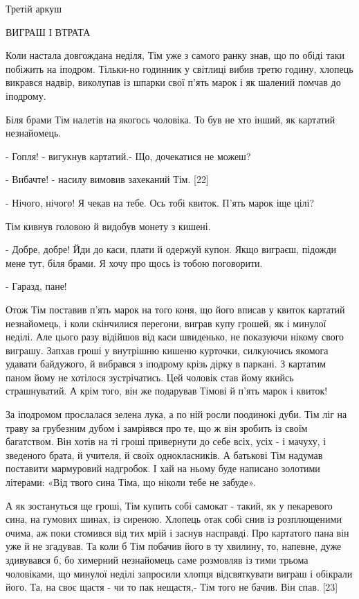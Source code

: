 Третій аркуш

ВИГРАШ І ВТРАТА

Коли настала довгождана неділя, Тім уже з самого ранку знав, що по обіді таки побіжить на іподром. Тільки-но годинник у світлиці вибив третю годину, хлопець викрався надвір, виколупав із шпарки свої п'ять марок і як шалений помчав до іподрому.

Біля брами Тім налетів на якогось чоловіка. То був не хто інший, як картатий незнайомець.

- Гопля! - вигукнув картатий.- Що, дочекатися не можеш?

- Вибачте! - насилу вимовив захеканий Тім. [22]

- Нічого, нічого! Я чекав на тебе. Ось тобі квиток. П'ять марок іще цілі?

Тім кивнув головою й видобув монету з кишені.

- Добре, добре! Йди до каси, плати й одержуй купон. Якщо виграєш, підожди мене тут, біля брами. Я хочу про щось із тобою поговорити.

- Гаразд, пане!

Отож Тім поставив п'ять марок на того коня, що його вписав у квиток картатий незнайомець, і коли скінчилися перегони, виграв купу грошей, як і минулої неділі. Але цього разу відійшов від каси швиденько, не показуючи нікому свого виграшу. Запхав гроші у внутрішню кишеню курточки, силкуючись якомога удавати байдужого, й вибрався з іподрому крізь дірку в паркані. З картатим паном йому не хотілося зустрічатись. Цей чоловік став йому якийсь страшнуватий. А крім того, він же подарував Тімові й п'ять марок і квиток!

За іподромом прослалася зелена лука, а по ній росли поодинокі дуби. Тім ліг на траву за грубезним дубом і замріявся про те, що ж він зробить із своїм багатством. Він хотів на ті гроші привернути до себе всіх, усіх - і мачуху, і зведеного брата, й учителя, й своїх однокласників. А батькові Тім надумав поставити мармуровий надгробок. І хай на ньому буде написано золотими літерами: «Від твого сина Тіма, що ніколи тебе не забуде».

А як зостануться ще гроші, Тім купить собі самокат - такий, як у пекаревого сина, на гумових шинах, із сиреною. Хлопець отак собі снив із розплющеними очима, аж поки стомився від тих мрій і заснув насправді. Про картатого пана він уже й не згадував. Та коли б Тім побачив його в ту хвилину, то, напевне, дуже здивувався б, бо химерний незнайомець саме розмовляв із тими трьома чоловіками, що минулої неділі запросили хлопця відсвяткувати виграш і обікрали його. Та, на своє щастя - чи то пак нещастя,- Тім того не бачив. Він спав. [23]

